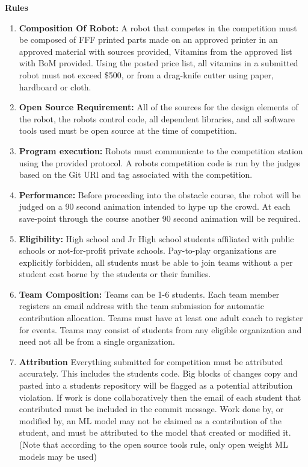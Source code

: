 \documentclass{article}
\begin{document}
  \pagebreak
{\huge \textbf{Rules}}

\begin{enumerate}
	
\item \textbf{Composition Of Robot:} A robot that competes in the competition must be composed of FFF printed parts made on an approved printer in an approved material with sources provided, Vitamins from the approved list with BoM provided. Using the posted price list, all vitamins in a submitted robot must not exceed \$500, or from a drag-knife cutter using paper, hardboard or cloth. 

\item \textbf{Open Source Requirement:} All of the sources for the design elements of the robot, the robots control code, all dependent libraries, and all software tools used must be open source at the time of competition. 

\item \textbf{Program execution:} Robots must communicate to the competition station using the provided protocol. A robots competition code is run by the judges based on the Git URl and tag associated with the competition. 


\item \textbf{Performance:} Before proceeding into the obstacle course, the robot will be judged on a 90 second animation intended to hype up the crowd. At each save-point through the course another 90 second animation will be required. 

\item \textbf{Eligibility:} High school and Jr High school students affiliated with public schools or not-for-profit private schools. Pay-to-play organizations are explicitly forbidden, all students must be able to join teams without a per student cost borne by the students or their families. 


\item \textbf{Team Composition:} Teams can be 1-6 students. Each team member registers an email address with the team submission for automatic contribution allocation. Teams must have at least one adult coach to register for events. Teams may consist of students from any eligible organization and need not all be from a single organization.  

 
\item \textbf{Attribution} Everything submitted for competition must be attributed accurately. This includes the students code. Big blocks of changes copy and pasted into a students repository will be flagged as a potential attribution violation. If work is done collaboratively then the email of each student that contributed must be included in the commit message. Work done by, or modified by, an ML model may not be claimed as a contribution of the student, and must be attributed to the model that created or modified it. (Note that according to the open source tools rule, only open weight ML models may be used)




\end{enumerate}
\end{document}
